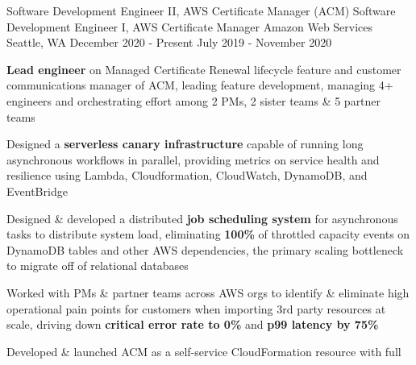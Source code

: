 


\begin{cventries}


\cventrylink
    {Software Development Engineer II, AWS Certificate Manager (ACM) \newline {\vspace{-.75mm}}
    Software Development Engineer I, AWS Certificate Manager}
{Amazon Web Services}
{Seattle, WA}
{December 2020 - Present \newline {\vspace{-1mm}}
    July 2019 - November 2020}
{ %
\begin{cvitems}
\item{\textbf{Lead engineer} on Managed Certificate Renewal lifecycle feature and customer
    communications manager of ACM, leading feature development, managing 4+ engineers
    and orchestrating effort among 2 PMs, 2 sister teams \& 5 partner teams}
\item{Designed a \textbf{serverless canary infrastructure} capable of running
    long asynchronous workflows in parallel, providing metrics on service health and
    resilience using Lambda, Cloudformation, CloudWatch, DynamoDB, and EventBridge}
\item{Designed \& developed a distributed \textbf{job scheduling system} for asynchronous tasks to
    distribute system load, eliminating \textbf{100\%} of throttled capacity events on DynamoDB
    tables and other AWS dependencies, the primary scaling bottleneck to migrate off of relational databases}
\item{Worked with PMs \& partner teams across AWS orgs to identify \& eliminate high
    operational pain points for customers when importing 3rd party resources at scale,
    driving down \textbf{critical error rate to 0\%} and \textbf{p99 latency by 75\%}}
\item{Developed \& launched ACM as a self-service CloudFormation resource with full
}
\end{cvitems}}
\end{cventries}
